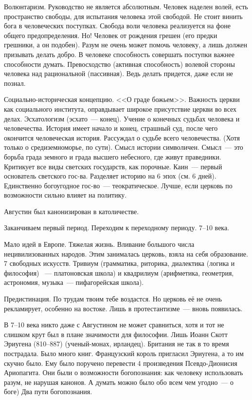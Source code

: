 Волюнтаризм. Руководство не является абсолютным. Человек наделен волей, есть пространство свободы, для испытания человека этой свободой. Не стоит винить бога в человеческих поступках. Свобода воли человека реализуется на фоне общего предопределения. Но! Человек от рождения грешен (его предки грешники, а он подобен). Разум не очень может помочь человеку, а лишь должен призывать делать добро. В человеке способность совершать поступки важнее способности думать. Превосходство (активная способность) волевой стороны человека над рациональной (пассивная). Ведь делать придется, даже если не познал.

Социально-историческая концепцию. <<О граде божьем>>. Важность церкви как социального института, оправдывает широкое присутствие церкви во всех делах. Эсхатологизм (эсхато~--- конец). Учение о конечных судьбах человека и человечества. История имеет начало и конец, страшный суд, после чего окончится человеческая история. Рассуждал о судьбе всего человечества. (Хотя только о средиземноморье, по сути). Смысл истории символичен. Смысл~--- это борьба града земного и града высшего небесного, где живут праведники. Критикует все виды светских государств, как порочные. Каин~--- первый основатель светского гос-ва. Разделяет историю на 6 эпох (см. 6 дней). Единственно богоугодное гос-во~--- теократическое. Лучше, если церковь по возможности сильно влияет на политику.

Августин был канонизирован в католичестве.

Заканчиваем первый период. Переходим к переходному периоду. 7--10 века.

Мало идей в Европе. Тяжелая жизнь. Вливание большого числа нецивилизованных народов. Этим занималась церковь, взяла на себя образование. 7 свободных искусств. Тривиум (грамматика, риторика, диалектика (логика и философия) ~--- платоновская школа) и квадрилиум (арифметика, геометрия, астрономия, музыка~--- пифагорейская школа). 

Предистинация. По трудам твоим тебе воздастся. Но церковь её не очень рекламирует, особенно на востоке. Лишь в протестантизме~--- вновь появилась.

В 7--10 века никто даже с Августином не может сравниться, хотя и тот не слишком крут был в плане значимости для философии.
Лишь Иоанн Скотт Эриугена (810--887) (ученый-монах, ирландец). Британия не так в то время пострадала. Было много книг. Французский король пригласил Эриугена, а то им скучно было. Ему было поручено перевести 4 произведения Псевдо-Дионисия Ариопагита. Они были о возможности богопознания: как человеку использовать разум, не нарушая канонов. А думать можно было обо всем чем угодно~--- о боге) 
Два пути богопознания.

